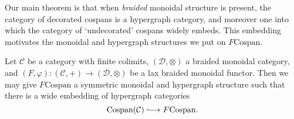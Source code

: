 Our main theorem is that when \emph{braided} monoidal structure is present, the
category of decorated cospans is a hypergraph category, and moreover one into
which the category of `undecorated' cospans widely embeds.  This embedding
motivates the monoidal and hypergraph structures we put on $F\mathrm{Cospan}$.

\begin{theorem} \label{thm:fcospans}
  Let $\mathcal C$ be a category with finite colimits, $(\mathcal D, \otimes)$ a
  braided monoidal category, and $(F,\varphi)\colon  (\mathcal C,+) \to (\mathcal D,
  \otimes)$ be a lax braided monoidal functor. Then we may give
  $F\mathrm{Cospan}$ a symmetric monoidal and hypergraph structure such that
  there is a wide embedding of hypergraph categories
  \[
    \mathrm{Cospan(\mathcal C)} \hooklongrightarrow F\mathrm{Cospan}.
  \]
\end{theorem}

